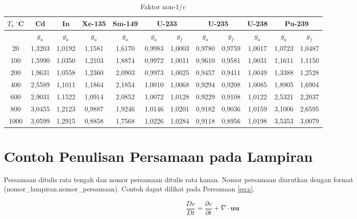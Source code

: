 \begin{table}
 \centering
 \caption{Faktor non-$1/v$}
  \begin{center}
\begin{tabular}{|c|c|c|c|c|c|c|c|c|c|c|c|}
\hline

$T$, $^\circ$C & Cd & In & Xe-135 & Sm-149 & \multicolumn{2}{|c|}{U-233} & \multicolumn{2}{|c|}{U-235}  & U-238 & \multicolumn{2}{|c|}{Pu-239} \\ 
\hline
     & $g_a$ & $g_a$& $g_a$ & $g_a$ & $g_a$ & $g_f$ & $g_a$ & $g_f$ & $g_a$  & $g_a$ & $g_f$ \\ 
20   & 1,3203 & 1,0192 & 1,1581 & 1,6170 & 0,9983 & 1,0003 & 0,9780 & 0,9759 & 1,0017 & 1,0723 & 1,0487  \\
100  & 1,5990 & 1,0350 & 1,2103 & 1,8874 & 0,9972 & 1,0011 & 0,9610 & 0,9581 & 1,0031 & 1,1611 & 1,1150  \\
200  & 1,9631 & 1,0558 & 1,2360 & 2,0903 & 0,9973 & 1,0025 & 0,9457 & 0,9411 & 1,0049 & 1,3388 & 1,2528 \\
400  & 2,5589 & 1,1011 & 1,1864 & 2,1854 & 1,0010 & 1,0068 & 0,9294 & 0,9208 & 1,0085 & 1,8905 & 1,6904 \\
600  & 2,9031 & 1,1522 & 1,0914 & 2,0852 & 1,0072 & 1,0128 & 0,9229 & 0,9108 & 1,0122 & 2,5321 & 2,2037 \\
800  & 3,0455 & 1,2123 & 0,9887 & 1,9246 & 1,0146 & 1,0201 & 0,9182 & 0,9036 & 1,0159 & 3,1006 & 2,6595 \\
1000 & 3,0599 & 1,2915 & 0,8858 & 1,7568 & 1,0226 & 1,0284 & 0,9118 & 0,8956 & 1,0198 & 3,5353 & 3,0079 \\
\hline
  \end{tabular}
  \end{center}

 \label{tbl: non-v1}
\end{table}



\section{Contoh Penulisan Persamaan pada Lampiran}

Persamaan ditulis rata tengah dan nomor persamaan ditulis rata kanan. Nomor persamaan
diurutkan dengan format (nomor\_lampiran.nomor\_persamaan). Contoh dapat dilihat pada Persamaan \eqref{eq:c}.

\begin{equation}
    \dfrac{Dv}{Dt} = \dfrac{\partial v}{\partial t} + \nabla \cdot \mathbf{uu}
\label{eq:c}
\end{equation}